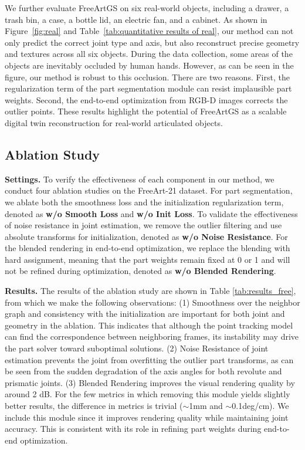We further evaluate FreeArtGS on six real-world objects, including a drawer, a trash bin, a case, a bottle lid, an electric fan, and a cabinet. As shown in Figure~\ref{fig:real} and Table~\ref{tab:quantitative results of real}, our method can not only predict the correct joint type and axis, but also reconstruct precise geometry and textures across all six objects. During the data collection, some areas of the objects are inevitably occluded by human hands. However, as can be seen in the figure, our method is robust to this occlusion. There are two reasons. First, the regularization term of the part segmentation module can resist implausible part weights. Second, the end-to-end optimization from RGB-D images corrects the outlier points. These results highlight the potential of FreeArtGS as a scalable digital twin reconstruction for real-world articulated objects.

\subsection{Ablation Study}

\noindent\textbf{Settings.} To verify the effectiveness of each component in our method, we conduct four ablation studies on the FreeArt-21 dataset. For part segmentation, we ablate both the smoothness loss and the initialization regularization term, denoted as \textbf{w/o Smooth Loss} and \textbf{w/o Init Loss}.
To validate the effectiveness of noise resistance in joint estimation, we remove the outlier filtering and use absolute transforms for initialization, denoted as \textbf{w/o Noise Resistance}.
For the blended rendering in end-to-end optimization, we replace the blending with hard assignment, meaning that the part weights remain fixed at 0 or 1 and will not be refined during optimization, denoted as \textbf{w/o Blended Rendering}.

\noindent\textbf{Results.} The results of the ablation study are shown in Table \ref{tab:results_free}, from which we make the following observations: (1) Smoothness over the neighbor graph and consistency with the initialization are important for both joint and geometry in the ablation. This indicates that although the point tracking model can find the correspondence between neighboring frames, its instability may drive the part solver toward suboptimal solutions. (2) Noise Resistance of joint estimation prevents the joint from overfitting the outlier part transforms, as can be seen from the sudden degradation of the axis angles for both revolute and prismatic joints. (3) Blended Rendering improves the visual rendering quality by around 2 dB. For the few metrics in which removing this module yields slightly better results, the difference in metrics is trivial ($\sim$1mm and $\sim$0.1deg/cm). We include this module since it improves rendering quality while maintaining joint accuracy. This is consistent with its role in refining part weights during end-to-end optimization. 

